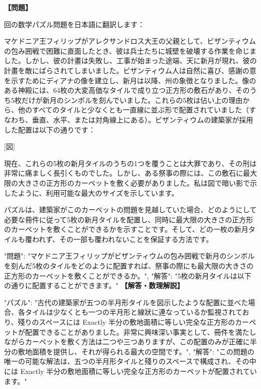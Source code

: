 \documentclass[10pt,a4paper,oneside,openany]{ltjsbook}
\begin{document}
\begin{tcolorbox}[colback=softblue,colframe=primaryblue,title=\textbf{第 312 問：THE FIVE CRESCENTS OF BYZANTIUM.},arc=2mm,boxrule=1pt,breakable]
\textbf{【問題】}\par\vspace{0.3em}
回の数学パズル問題を日本語に翻訳します：

マケドニア王フィリップがアレクサンドロス大王の父親として、ビザンティウムの包み囲戦で困難に直面したとき、彼は兵士たちに城壁を破壊する作業を命じました。しかし、彼の計畫は失敗し、工事が始まった途端、天に新月が現れ、彼の計畫を敵にばらされてしまいました。ビザンティウム人は自然に喜び、感謝の意を示すためにディアナの像を建立し、新月は以降、州の象徴となりました。像のある神殿には、64枚の大変高価なタイルで成り立つ正方形の敷石があり、そのうち5枚だけが新月のシンボルを刻んでいました。これらの5枚は佔い上の理由から、他のすべてのタイルと少なくとも一直線に並ぶ形で配置されていました（すなわち、垂直、水平、または対角線上にある）。ビザンティウムの建築家が採用した配置は以下の通りです：

[図]

現在、これらの5枚の新月タイルのうちの1つを覆うことは大罪であり、その刑は非常に痛ましく長引くものでした。しかし、ある祭事の際には、この敷石に最大限の大きさの正方形のカーペットを敷く必要がありました。私は図で暗い影で示したように、利用可能な最大のサイズを示しています。

パズルは、建築家がこのカーペットの問題を見越していた場合、どのようにして必要な冊件に従って5枚の新月タイルを配置し、同時に最大限の大きさの正方形のカーペットを敷くことができるかを示すことです。そして、どの一枚の新月タイルも覆われず、その一部も覆われないことを保証する方法です。

{
  "問題": "マケドニア王フィリップがビザンティウムの包み囲戦で新月のシンボルを刻んだ5枚のタイルをどのように配置すれば、祭事の際にも最大限の大きさの正方形のカーペットを敷くことができるか。",
  "解答": "5枚の新月タイルは以下の通りに配置することができます。"
}
\tcblower
\textbf{【解答・数理解説】}\par\vspace{0.3em}
{
"パズル": "古代の建築家が五つの半月形タイルを図示したような配置に並べた場合、各タイルは少なくとも一つの半月形と線狀に連なっているか監視されており、殘りのスペースには Exactly 半分の敷地面積に等しい完全な正方形のカーペットが配置できることがありました。非常に興味深い事実として、冊件を満たしながらカーペットを敷く方法は二つや三つありますが、この配置のみが正確に半分の敷地面積を提供し、それが得られる最大の空間です。",
"解答": "この問題の唯一の可能な解法は、五つの半月形タイルと殘りのスペースで構成され、その中には Exactly 半分の敷地面積に等しい完全な正方形のカーペットが配置されています。"
}
\end{tcolorbox}
\end{document}

